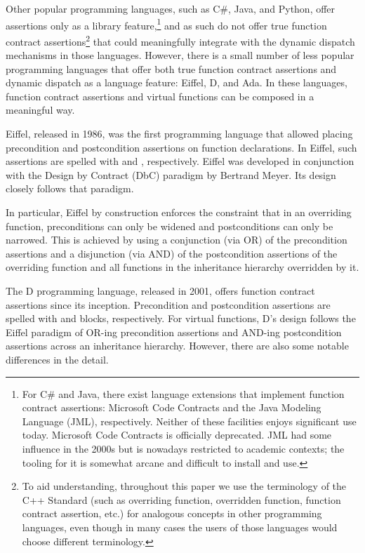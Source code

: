 Other popular programming languages, such as C\#, Java, and Python, offer assertions only as a library feature,\footnote{For C\# and Java, there exist language extensions that implement function contract assertions: Microsoft Code Contracts and the Java Modeling Language (JML), respectively. Neither of these facilities enjoys significant use today. Microsoft Code Contracts is officially deprecated. JML had some influence in the 2000s but is nowadays restricted to academic contexts; the tooling for it is somewhat arcane and difficult to install and use.} and as such do not offer true function contract assertions\footnote{To aid understanding, throughout this paper we use the terminology of the C++ Standard (such as overriding function, overridden function, function contract assertion, etc.) for analogous concepts in other programming languages, even though in many cases the users of those languages would choose different terminology.} that could meaningfully integrate with the  dynamic dispatch mechanisms in those languages. However, there is a small number of less popular programming languages that offer both true function contract assertions and dynamic dispatch as a language feature: Eiffel, D, and Ada. In these languages, function contract assertions and virtual functions can be composed in a meaningful way.

Eiffel, released in 1986, was the first programming language that allowed placing precondition and postcondition assertions on function declarations. In Eiffel, such assertions are spelled with  and , respectively. Eiffel was developed in conjunction with the Design by Contract (DbC) paradigm by Bertrand Meyer. Its design closely follows that paradigm.

In particular, Eiffel by construction enforces the constraint that in an overriding function, preconditions can only be widened and postconditions can only be narrowed. This is achieved by using a conjunction (via OR) of the precondition assertions and a disjunction (via AND) of the postcondition assertions of the overriding function and all functions in the inheritance hierarchy overridden by it.

The D programming language, released in 2001, offers function contract assertions since its inception. Precondition and postcondition assertions are spelled with  and  blocks, respectively. For virtual functions, D's design follows the Eiffel paradigm of OR-ing precondition assertions and AND-ing postcondition assertions across an inheritance hierarchy. However, there are also some notable differences in the detail.

